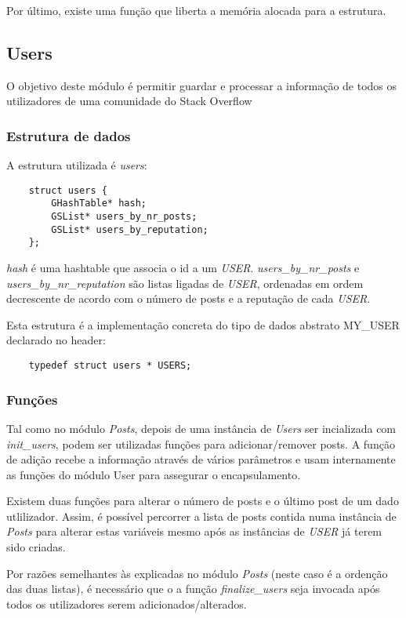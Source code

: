 \documentclass[10pt]{article}
\begin{document}
	Por último, existe uma função que liberta a memória alocada para a estrutura.

\subsection{Users}
	O objetivo deste módulo é permitir guardar e processar a informação de todos os utilizadores de uma comunidade do Stack Overflow
\subsubsection{Estrutura de dados}

	A estrutura utilizada é \emph{users}:
	\begin{lstlisting}
	struct users {
		GHashTable* hash;
		GSList* users_by_nr_posts;
		GSList* users_by_reputation;
	};
	\end{lstlisting}

	\emph{hash} é uma hashtable que associa o id a um \emph{USER}. \emph{users\_by\_nr\_posts} e \emph{users\_by\_nr\_reputation} são listas ligadas de \emph{USER}, ordenadas em ordem decrescente de acordo com o número de posts e a reputação de cada \emph{USER}.

	Esta estrutura é a implementação concreta do tipo de dados abstrato MY\_USER declarado no header:
	\begin{lstlisting} 
	typedef struct users * USERS;
	\end{lstlisting}

\subsubsection{Funções}
	Tal como no módulo \emph{Posts}, depois de uma instância de \emph{Users} ser incializada com \emph{init\_users}, podem ser utilizadas funções para adicionar/remover posts. A função de adição recebe a informação através de vários parâmetros e usam internamente as funções do módulo User para assegurar o encapsulamento.

	Existem duas funções para alterar o número de posts e o último post de um dado utlilizador. Assim, é possível percorrer a lista de posts contida numa instância de \emph{Posts} para alterar estas variáveis mesmo após as instâncias de \emph{USER} já terem sido criadas.

	Por razões semelhantes às explicadas no módulo \emph{Posts} (neste caso é a ordenção das duas listas), é necessário que o a função \emph{finalize\_users} seja invocada após todos os utilizadores serem adicionados/alterados.
\end{document}
